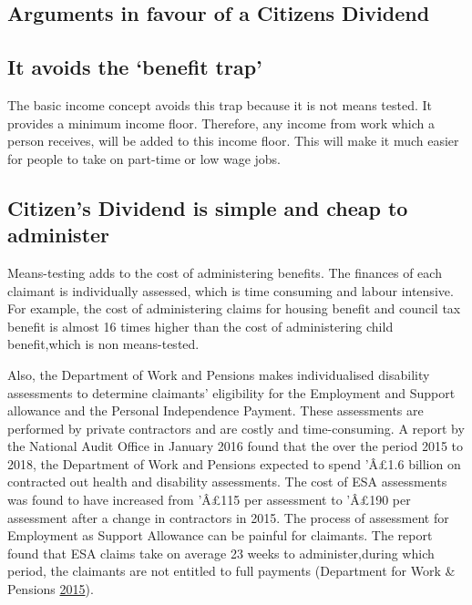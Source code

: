 \documentclass[]{tufte-handout}
\begin{document}
\hypertarget{arguments-in-favour-of-a-citizens-dividend}{%
\subsection{Arguments in favour of a Citizens
Dividend}\label{arguments-in-favour-of-a-citizens-dividend}}

\hypertarget{it-avoids-the-benefit-trap}{%
\subsection{It avoids the `benefit
trap'}\label{it-avoids-the-benefit-trap}}

The basic income concept avoids this trap because it is not means
tested. It provides a minimum income floor. Therefore, any income from
work which a person receives, will be added to this income floor. This
will make it much easier for people to take on part-time or low wage
jobs.

\hypertarget{citizens-dividend-is-simple-and-cheap-to-administer}{%
\subsection{Citizen's Dividend is simple and cheap to
administer}\label{citizens-dividend-is-simple-and-cheap-to-administer}}

Means-testing adds to the cost of administering benefits. The finances
of each claimant is individually assessed, which is time consuming and
labour intensive. For example, the cost of administering claims for
housing benefit and council tax benefit is almost 16 times higher than
the cost of administering child benefit,which is non means-tested.

Also, the Department of Work and Pensions makes individualised
disability assessments to determine claimants' eligibility for the
Employment and Support allowance and the Personal Independence Payment.
These assessments are performed by private contractors and are costly
and time-consuming. A report by the National Audit Office in January
2016 found that the over the period 2015 to 2018, the Department of Work
and Pensions expected to spend 'Â£1.6 billion on contracted out health
and disability assessments. The cost of ESA assessments was found to
have increased from 'Â£115 per assessment to 'Â£190 per assessment after
a change in contractors in 2015. The process of assessment for
Employment as Support Allowance can be painful for claimants. The report
found that ESA claims take on average 23 weeks to administer,during
which period, the claimants are not entitled to full payments
(Department for Work \& Pensions
\protect\hyperlink{ref-DeptForWorkAndPensions2015}{2015}).
\end{document}

